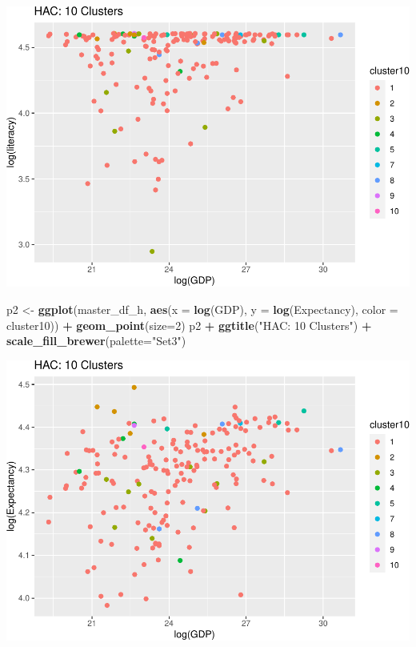 \documentclass[]{article}
\newenvironment{Shaded}{\begin{snugshade}}{\end{snugshade}}
\newcommand{\DataTypeTok}[1]{\textcolor[rgb]{0.13,0.29,0.53}{#1}}
\newcommand{\DecValTok}[1]{\textcolor[rgb]{0.00,0.00,0.81}{#1}}
\newcommand{\KeywordTok}[1]{\textcolor[rgb]{0.13,0.29,0.53}{\textbf{#1}}}
\newcommand{\NormalTok}[1]{#1}
\newcommand{\OperatorTok}[1]{\textcolor[rgb]{0.81,0.36,0.00}{\textbf{#1}}}
\newcommand{\StringTok}[1]{\textcolor[rgb]{0.31,0.60,0.02}{#1}}
\begin{document}
\includegraphics{eda_files/figure-latex/unnamed-chunk-30-4.pdf}

\begin{Shaded}
\begin{Highlighting}[]
\NormalTok{p2 <-}\StringTok{ }\KeywordTok{ggplot}\NormalTok{(master_df_h, }\KeywordTok{aes}\NormalTok{(}\DataTypeTok{x =} \KeywordTok{log}\NormalTok{(GDP), }\DataTypeTok{y =} \KeywordTok{log}\NormalTok{(Expectancy), }\DataTypeTok{color =}\NormalTok{ cluster10)) }\OperatorTok{+}
\StringTok{  }\KeywordTok{geom_point}\NormalTok{(}\DataTypeTok{size=}\DecValTok{2}\NormalTok{)}
\NormalTok{p2 }\OperatorTok{+}\StringTok{ }\KeywordTok{ggtitle}\NormalTok{(}\StringTok{"HAC: 10 Clusters"}\NormalTok{) }\OperatorTok{+}\StringTok{ }\KeywordTok{scale_fill_brewer}\NormalTok{(}\DataTypeTok{palette=}\StringTok{"Set3"}\NormalTok{)}
\end{Highlighting}
\end{Shaded}

\includegraphics{eda_files/figure-latex/unnamed-chunk-30-5.pdf}
\end{document}
